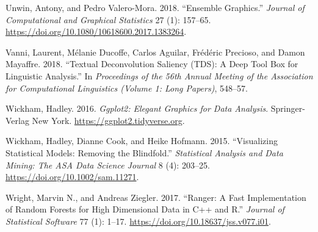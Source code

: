 \documentclass[
]{article}
\newlength{\cslhangindent}
\newlength{\cslentryspacingunit} %
\newenvironment{CSLReferences}[2] %
 {%
  \setlength{\parindent}{0pt}
  \ifodd #1
  \let\oldpar\par
  \def\par{\hangindent=\cslhangindent\oldpar}
  \fi
  \setlength{\parskip}{#2\cslentryspacingunit}
 }%
 {}
\begin{document}
\begin{CSLReferences}{1}{0}
\leavevmode{}%
Unwin, Antony, and Pedro Valero-Mora. 2018. {``Ensemble {Graphics}.''} \emph{Journal of Computational and Graphical Statistics} 27 (1): 157--65. \url{https://doi.org/10.1080/10618600.2017.1383264}.

\leavevmode{}%
Vanni, Laurent, Mélanie Ducoffe, Carlos Aguilar, Frédéric Precioso, and Damon Mayaffre. 2018. {``Textual {Deconvolution} {Saliency} ({TDS}): A Deep Tool Box for Linguistic Analysis.''} In \emph{Proceedings of the 56th {Annual} {Meeting} of the {Association} for {Computational} {Linguistics} ({Volume} 1: {Long} {Papers})}, 548--57.

\leavevmode{}%
Wickham, Hadley. 2016. \emph{Ggplot2: {Elegant} {Graphics} for {Data} {Analysis}}. Springer-Verlag New York. \url{https://ggplot2.tidyverse.org}.

\leavevmode{}%
Wickham, Hadley, Dianne Cook, and Heike Hofmann. 2015. {``Visualizing Statistical Models: {Removing} the Blindfold.''} \emph{Statistical Analysis and Data Mining: The ASA Data Science Journal} 8 (4): 203--25. \url{https://doi.org/10.1002/sam.11271}.

\leavevmode{}%
Wright, Marvin N., and Andreas Ziegler. 2017. {``Ranger: {A} {Fast} {Implementation} of {Random} {Forests} for {High} {Dimensional} {Data} in {C}++ and {R}.''} \emph{Journal of Statistical Software} 77 (1): 1--17. \url{https://doi.org/10.18637/jss.v077.i01}.

\end{CSLReferences}
\end{document}
